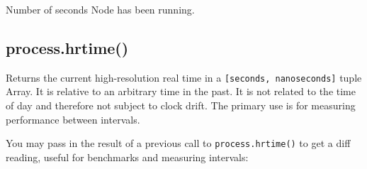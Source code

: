 Number of seconds Node has been running.

\subsection{process.hrtime()}\label{process.hrtime}

Returns the current high-resolution real time in a
\texttt{{[}seconds, nanoseconds{]}} tuple Array. It is relative to an
arbitrary time in the past. It is not related to the time of day and
therefore not subject to clock drift. The primary use is for measuring
performance between intervals.

You may pass in the result of a previous call to
\texttt{process.hrtime()} to get a diff reading, useful for benchmarks
and measuring intervals:

\begin{Shaded}
\end{Shaded}

